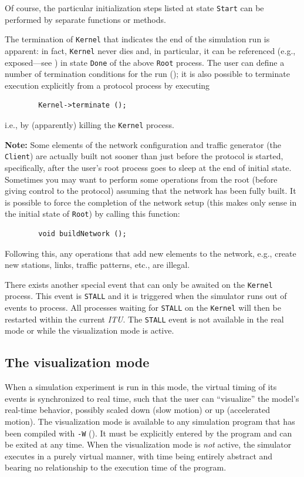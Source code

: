 Of course, the particular initialization steps listed at state {\tt Start}
can be performed by separate functions or methods.

The termination of {\tt Kernel} that indicates the end of the simulation
run is apparent: in fact, {\tt Kernel} never dies and, in particular, it
can be referenced (e.g., exposed---see )
in state {\tt Done} of the above {\tt Root} process.
The user can define a number of termination conditions for the
run ();
it is also possible to terminate execution explicitly
from a protocol process by executing
\begin{verbatim}
        Kernel->terminate ();
\end{verbatim}
i.e., by (apparently) killing the {\tt Kernel} process.

\medskip

\noindent
{\bf Note:}
Some elements of the network configuration and traffic generator
(the {\tt Client}) are actually built not sooner than
just before the protocol is started, specifically,
after the user's root process goes to sleep at the end of initial state.
Sometimes you may want to perform some operations from the root (before
giving control to the protocol) assuming that the network has been fully built.
It is possible to force the completion of the
network setup (this makes only sense in the initial state of {\tt Root})
by calling this function:
\begin{verbatim}
        void buildNetwork ();
\end{verbatim}
Following this, any operations that
add new elements to the network, e.g., create new stations, links, traffic
patterns, etc., are illegal.

\medskip

There exists another special event that can only be awaited on the
{\tt Kernel} process.
This event is {\tt STALL} and it is triggered when the simulator runs out
of events to process.
All processes waiting for {\tt STALL} on the {\tt Kernel} will then be
restarted within the current {\em ITU}.
The {\tt STALL} event is not available in the real mode or while the
visualization mode is active.

\subsection{The visualization mode}
\label{rm_pr_vi}

When a simulation experiment is run in this mode, the virtual timing of its
events is synchronized to real time, such that the user can ``visualize'' the
model's real-time behavior, possibly scaled down (slow motion) or up
(accelerated motion).
The visualization mode is available to any simulation program that
has been compiled with {\tt -W} ().
It must be explicitly entered by the program and can be exited at any time.
When the visualization mode is {\em not\/} active, the simulator executes in
a purely virtual manner, with time being entirely abstract and bearing no
relationship to the execution time of the program.


